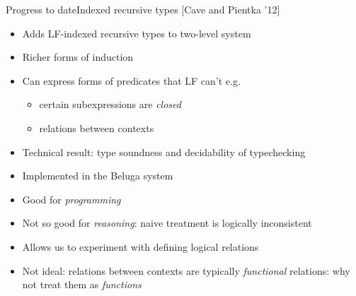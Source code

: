 \documentclass[usenames,dvipsnames]{beamer}
\begin{document}

\begin{frame}{Progress to date}{Indexed recursive types [Cave and Pientka '12]}
\begin{itemize}
\item Adds LF-indexed recursive types to two-level system
\item Richer forms of induction
\item Can express forms of predicates that LF can't e.g.
\begin{itemize}
\item certain subexpressions are \emph{closed}
\item relations between contexts
\end{itemize}
\item Technical result: type soundness and decidability of typechecking
\item Implemented in the Beluga system
\item Good for \emph{programming}
\item Not so good for \emph{reasoning}: naive treatment is logically inconsistent
\item Allows us to experiment with defining logical relations
\item Not ideal: relations between contexts are typically \emph{functional} relations: why not treat them as \emph{functions}
\end{itemize}
\end{frame}
\end{document}
